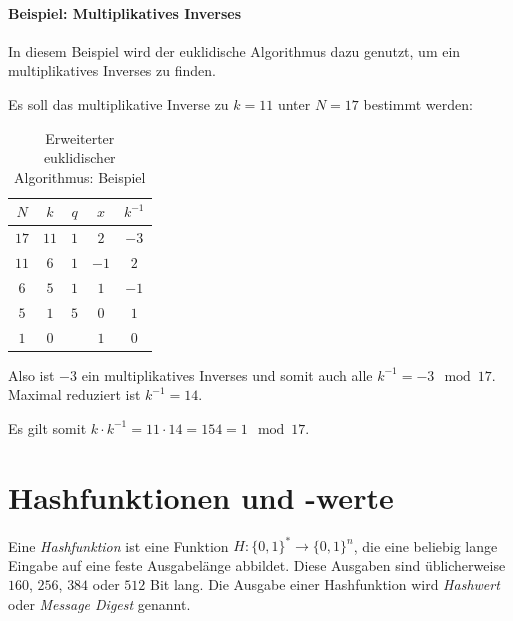 \documentclass[a4paper, 11pt, accentcolor = tud3b]{tudreport}
\begin{document}
	            \paragraph{Beispiel: Multiplikatives Inverses}
		            In diesem Beispiel wird der euklidische Algorithmus dazu genutzt, um ein multiplikatives Inverses zu finden.
		            
		            Es soll das multiplikative Inverse zu \(k = 11\) unter \(N = 17\) bestimmt werden:
		            \begin{table}[H]
		            	\centering
		            	\begin{tabular}{|c|c|c|c|c|}
		            		\hline
		            		      \(N\)       & \(k\)  & \(q\) &       \(x\)       &     \(k^{-1}\)     \\ \hline
		            		     \(17\)       & \(11\) & \(1\) & \underline{\(2\)} & \underline{\(-3\)} \\ \hline
		            		     \(11\)       & \(6\)  & \(1\) &      \(-1\)       &       \(2\)        \\ \hline
		            		      \(6\)       & \(5\)  & \(1\) &       \(1\)       &       \(-1\)       \\ \hline
		            		      \(5\)       & \(1\)  & \(5\) &       \(0\)       &       \(1\)        \\ \hline
		            		\underline{\(1\)} & \(0\)  & \(\)  &       \(1\)       &       \(0\)        \\ \hline
		            	\end{tabular}
		            	\caption{Erweiterter euklidischer Algorithmus: Beispiel}
		            \end{table}
		            Also ist \(-3\) ein multiplikatives Inverses und somit auch alle \(k^{-1} = -3 \mod 17\). Maximal reduziert ist \(k^{-1}=14\).
		            
		            Es gilt somit \(k \cdot k^{-1} = 11 \cdot 14 = 154 = 1 \mod 17\).

        \section{Hashfunktionen und -werte}
            Eine \textit{Hashfunktion} ist eine Funktion \( H : \{0,1\}^* \rightarrow \{0,1\}^n \), die eine beliebig lange Eingabe auf eine feste Ausgabelänge abbildet. Diese Ausgaben sind üblicherweise \(160\), \(256\), \(384\) oder \(512\) Bit lang. Die Ausgabe einer Hashfunktion wird \textit{Hashwert} oder \textit{Message Digest} genannt.
            
\end{document}
